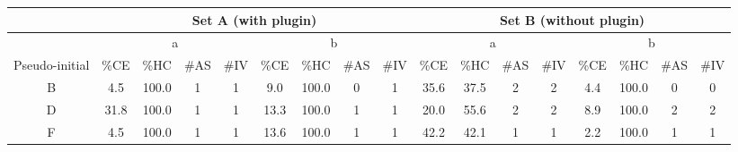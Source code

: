 \begin{landscape}
  \begin{table}[p]
    \begin{tabular}{@{}ccccccccccccccccc@{}}
      \toprule
      \multicolumn{1}{l}{}                & \multicolumn{8}{c}{Set A (with plugin)}                                                                                                                      & \multicolumn{8}{c}{Set B (without plugin)}                                                                                                                                                         \\ \midrule
      \multicolumn{1}{c|}{}               & \multicolumn{4}{c|}{a}                          & \multicolumn{4}{c|}{b}                                                                                     & \multicolumn{4}{c|}{a}                                                                 & \multicolumn{4}{c}{b}                                                                                     \\ \midrule
      \multicolumn{1}{c|}{Pseudo-initial} & \%CE & \%HC  & \#AS & \multicolumn{1}{l|}{\#IV} & \multicolumn{1}{l}{\%CE} & \multicolumn{1}{l}{\%HC} & \multicolumn{1}{l}{\#AS} & \multicolumn{1}{l|}{\#IV} & \%CE & \multicolumn{1}{l}{\%HC} & \multicolumn{1}{l}{\#AS} & \multicolumn{1}{l|}{\#IV} & \multicolumn{1}{l}{\%CE} & \multicolumn{1}{l}{\%HC} & \multicolumn{1}{l}{\#AS} & \multicolumn{1}{l}{\#IV} \\ \midrule
      \multicolumn{1}{c|}{B}              & 4.5  & 100.0 & 1    & \multicolumn{1}{c|}{1}    & 9.0                      & 100.0                    & 0                        & \multicolumn{1}{c|}{1}    & 35.6 & 37.5                     & 2                        & \multicolumn{1}{c|}{2}    & 4.4                      & 100.0                    & 0                        & 0                        \\
      \multicolumn{1}{c|}{D}              & 31.8 & 100.0 & 1    & \multicolumn{1}{c|}{1}    & 13.3                     & 100.0                    & 1                        & \multicolumn{1}{c|}{1}    & 20.0 & 55.6                     & 2                        & \multicolumn{1}{c|}{2}    & 8.9                      & 100.0                    & 2                        & 2                        \\
      \multicolumn{1}{c|}{F}              & 4.5  & 100.0 & 1    & \multicolumn{1}{c|}{1}    & 13.6                     & 100.0                    & 1                        & \multicolumn{1}{c|}{1}    & 42.2 & 42.1                     & 1                        & \multicolumn{1}{c|}{1}    & 2.2                      & 100.0                    & 1                        & 1                        \\

\end{tabular}
\end{table}
\end{landscape}
